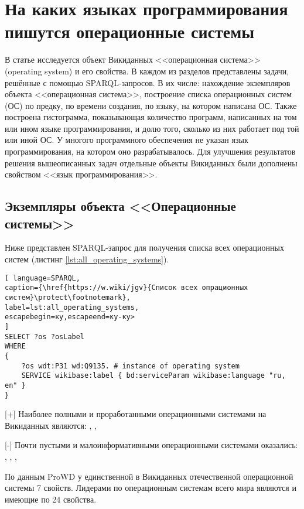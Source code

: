 \chapter{На каких языках программирования пишутся операционные системы}
\label{ch:operating-sysmets}

В статье исследуется объект Викиданных <<операционная система>> (operating system) и его свойства. В каждом из разделов представлены задачи, решённые с помощью SPARQL-запросов. В их числе: нахождение экземпляров объекта <<операционная система>>, построение списка операционных систем (ОС) по предку, по времени создания, по языку, на котором написана ОС. Также построена гистограмма, показывающая количество программ, написанных на том или ином языке программирования, и долю того, сколько из них работает под той или иной ОС. У многого программного обеспечения не указан язык программирования, на котором оно разрабатывалось. Для улучшения результатов решения вышеописанных задач отдельные объекты Викиданных были дополнены свойством <<язык программирования>>.


\section{Экземпляры объекта <<Операционные системы>>}
Ниже представлен SPARQL-запрос для получения списка всех операционных систем (листинг \ref{lst:all_operating_systems}).

\begin{lstlisting}[ language=SPARQL, 
caption={\href{https://w.wiki/jgv}{Список всех опрационных систем}\protect\footnotemark},
label=lst:all_operating_systems, 
escapebegin=ку,escapeend=ку-ку>
]
SELECT ?os ?osLabel
WHERE
{
	?os wdt:P31 wd:Q9135. # instance of operating system
	SERVICE wikibase:label { bd:serviceParam wikibase:language "ru, en" }
}
\end{lstlisting}

[+] Наиболее полными и проработанными операционными системами на Викиданных являются: , , 

[-] Почти пустыми и малоинформативными операционными системами оказались: , , , 

По данным ProWD у единственной в Викиданных отечественной операционной системы  7 свойств. Лидерами по операционным системам всего мира являются  и  имеющие по 24 свойства.


